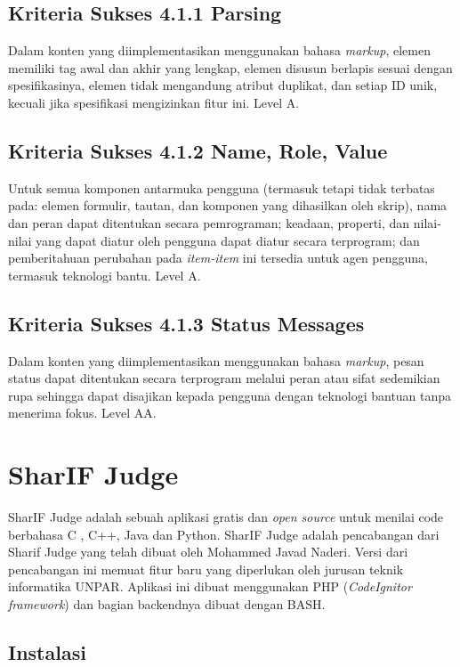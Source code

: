 \subsection{Kriteria Sukses 4.1.1 Parsing}
\label{sec:kriteria_4.1.1}
Dalam konten yang diimplementasikan menggunakan bahasa \textit{markup}, elemen memiliki tag awal dan akhir yang lengkap, elemen disusun berlapis sesuai dengan spesifikasinya, elemen tidak mengandung atribut duplikat, dan setiap ID unik, kecuali jika spesifikasi mengizinkan fitur ini.
Level A.

\subsection{Kriteria Sukses 4.1.2 Name, Role, Value}
\label{sec:kriteria_4.1.2}
Untuk semua komponen antarmuka pengguna (termasuk tetapi tidak terbatas pada: elemen formulir, tautan, dan komponen yang dihasilkan oleh skrip), nama dan peran dapat ditentukan secara pemrograman; keadaan, properti, dan nilai-nilai yang dapat diatur oleh pengguna dapat diatur secara terprogram; dan pemberitahuan perubahan pada \textit{item-item} ini tersedia untuk agen pengguna, termasuk teknologi bantu.
Level A.

\subsection{Kriteria Sukses 4.1.3 Status Messages}
\label{sec:kriteria_4.1.3}
Dalam konten yang diimplementasikan menggunakan bahasa \textit{markup}, pesan status dapat ditentukan secara terprogram melalui peran atau sifat sedemikian rupa sehingga dapat disajikan kepada pengguna dengan teknologi bantuan tanpa menerima fokus.
Level AA.

\section{SharIF Judge}
SharIF Judge adalah sebuah aplikasi gratis dan \textit{open source} untuk menilai code berbahasa C , C++, Java dan Python. SharIF Judge adalah pencabangan dari Sharif Judge yang telah dibuat oleh Mohammed Javad Naderi. Versi dari pencabangan ini memuat fitur baru yang diperlukan oleh jurusan teknik informatika UNPAR. Aplikasi ini dibuat menggunakan PHP (\textit{CodeIgnitor framework}) dan bagian backendnya dibuat dengan BASH.

\subsection{Instalasi}

